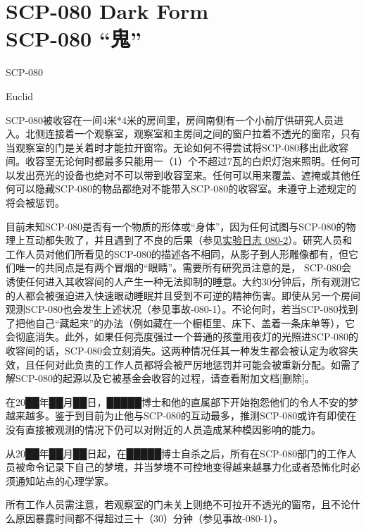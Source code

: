 \chapter[SCP-080 “鬼”]{
    SCP-080 Dark Form\\
    SCP-080 “鬼”
}

\label{chap:SCP-080}

SCP-080

Euclid

SCP-080被收容在一间4米*4米的房间里，房间南侧有一个小前厅供研究人员进入。北侧连接着一个观察室，观察室和主房间之间的窗户拉着不透光的窗帘，只有当观察室的门是关着时才能拉开窗帘。无论如何不得尝试将SCP-080移出此收容间。收容室无论何时都最多只能用一（1）个不超过7瓦的白炽灯泡来照明。任何可以发出亮光的设备也绝对不可以带到收容室来。任何可以用来覆盖、遮掩或其他任何可以隐藏SCP-080的物品都绝对不能带入SCP-080的收容室。未遵守上述规定的将会被惩罚。

目前未知SCP-080是否有一个物质的形体或“身体”，因为任何试图与SCP-080的物理上互动都失败了，并且遇到了不良的后果（参见\hyperref[chap:DOC-experiment-log-080-2]{实验日志 080-2}）。研究人员和工作人员对他们所看见的SCP-080的描述各不相同，从影子到人形雕像都有，但它们唯一的共同点是有两个冒烟的“眼睛”。需要所有研究员注意的是， SCP-080会诱使任何进入其收容间的人产生一种无法抑制的睡意。大约30分钟后，所有观测它的人都会被强迫进入快速眼动睡眠并且受到不可逆的精神伤害。即使从另一个房间观测SCP-080也会发生上述状况（参见事故-080-1）。不论何时，若当SCP-080找到了把他自己“藏起来”的办法（例如藏在一个橱柜里、床下、盖着一条床单等），它会彻底消失。此外，如果任何亮度强过一个普通的孩童用夜灯的光照进SCP-080的收容间的话，SCP-080会立刻消失。这两种情况任其一种发生都会被认定为收容失效，且任何对此负责的工作人员都将会被严厉地惩罚并可能会被重新分配。如需了解SCP-080的起源以及它被基金会收容的过程，请查看附加文档{[}删除]。

在20██年██月██日，█████博士和他的直属部下开始抱怨他们的令人不安的梦越来越多。鉴于到目前为止他与SCP-080的互动最多，推测SCP-080或许有即使在没有直接被观测的情况下仍可以对附近的人员造成某种模因影响的能力。

从20██年██月██日起，在█████博士自杀之后，所有在SCP-080部门的工作人员被命令记录下自己的梦境，并当梦境不可控地变得越来越暴力化或者恐怖化时必须通知站点的心理学家。

所有工作人员需注意，若观察室的门未关上则绝不可拉开不透光的窗帘，且不论什么原因暴露时间都不得超过三十（30）分钟（参见事故-080-1）。

